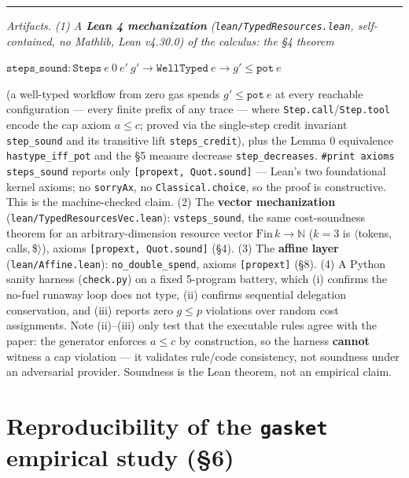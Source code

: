 \documentclass[11pt]{article}
\theoremstyle{plain}
\begin{document}
\bigskip
\noindent\rule{\linewidth}{0.4pt}
\medskip

{\itshape
\noindent Artifacts. (1) A {\bfseries Lean 4 mechanization} (\texttt{lean/TypedResources.lean},
self-contained, no Mathlib, Lean v4.30.0) of the calculus: the \S4 theorem
\begin{center}
\upshape
$\texttt{steps\_sound} : \texttt{Steps}\ e\ 0\ e'\ g' \to \texttt{WellTyped}\ e \to
g' \le \texttt{pot}\ e$
\end{center}
(a well-typed workflow from zero gas spends $g' \le \texttt{pot}\ e$ at every reachable
configuration --- every finite prefix of any trace --- where \texttt{Step.call}/\texttt{Step.tool}
encode the cap axiom $a \le c$; proved via the single-step credit invariant \texttt{step\_sound}
and its transitive lift \texttt{steps\_credit}), plus the Lemma 0 equivalence
\texttt{hastype\_iff\_pot} and the \S5 measure decrease \texttt{step\_decreases}.
\texttt{\#print axioms steps\_sound} reports only \texttt{[propext, Quot.sound]} --- Lean's two
foundational kernel axioms; no \texttt{sorryAx}, no \texttt{Classical.choice}, so the proof is
constructive. This is the machine-checked claim. (2) The {\bfseries vector mechanization}
(\texttt{lean/TypedResourcesVec.lean}): \texttt{vsteps\_sound}, the same cost-soundness theorem for
an arbitrary-dimension resource vector $\mathrm{Fin}\,k \to \mathbb{N}$ ($k=3$ is
$\langle$tokens,\,calls,\,\$$\rangle$), axioms \texttt{[propext, Quot.sound]} (\S4). (3) The
{\bfseries affine layer} (\texttt{lean/Affine.lean}): \texttt{no\_double\_spend}, axioms
\texttt{[propext]} (\S8). (4) A
Python sanity harness (\texttt{check.py}) on a fixed 5-program battery, which (i) confirms the
no-fuel runaway loop does not type, (ii) confirms sequential delegation conservation, and (iii)
reports zero $g \le p$ violations over random cost assignments. Note (ii)--(iii) only test that the
executable rules agree with the paper: the generator enforces $a \le c$ by construction, so the
harness {\bfseries cannot} witness a cap violation --- it validates rule/code consistency, not
soundness under an adversarial provider. Soundness is the Lean theorem, not an empirical claim.}




\appendix

\section{Reproducibility of the \texttt{gasket} empirical study (\S6)}
\end{document}
